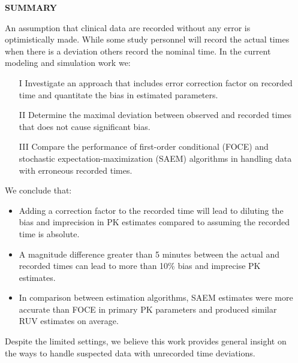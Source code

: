 \documentclass[final]{beamer}
\newlength{\sepwidth}
\newlength{\colwidth}
\newcommand{\separatorcolumn}{\begin{column}{\sepwidth}\end{column}}
\begin{document}
\begin{frame}[t]
\begin{columns}[t]
\separatorcolumn

\begin{column}{\colwidth}

  \begin{alertblock}{\textbf{SUMMARY}}

An assumption that clinical data are recorded without any error is optimistically made. While some study personnel will record the actual times when there is a deviation others record the nominal time. In the current modeling and simulation work we:
\begin{itemize}
\item[I] Investigate an approach that includes error correction factor on recorded time and quantitate the bias in estimated parameters.
\item[II] Determine the maximal deviation between observed and recorded times that does not cause significant bias.
\item[III] Compare the performance of first-order conditional (FOCE) and stochastic expectation-maximization (SAEM) algorithms in handling data with erroneous recorded times.
\end{itemize}
We conclude that:
\begin{itemize}
    \item Adding a correction factor to the recorded time will lead to diluting the bias and imprecision in PK estimates compared to assuming the recorded time is absolute.
    \item A magnitude difference greater than 5 minutes between the actual and recorded times can lead to more than 10\% bias and imprecise PK estimates.
    \item In comparison between estimation algorithms, SAEM estimates were more accurate than FOCE in primary PK parameters and produced similar RUV estimates on average.
\end{itemize}

Despite the limited settings, we believe this work provides general insight on the ways to handle suspected data with unrecorded time deviations.


\end{alertblock}
\end{column}
\end{columns}
\end{frame}
\end{document}
